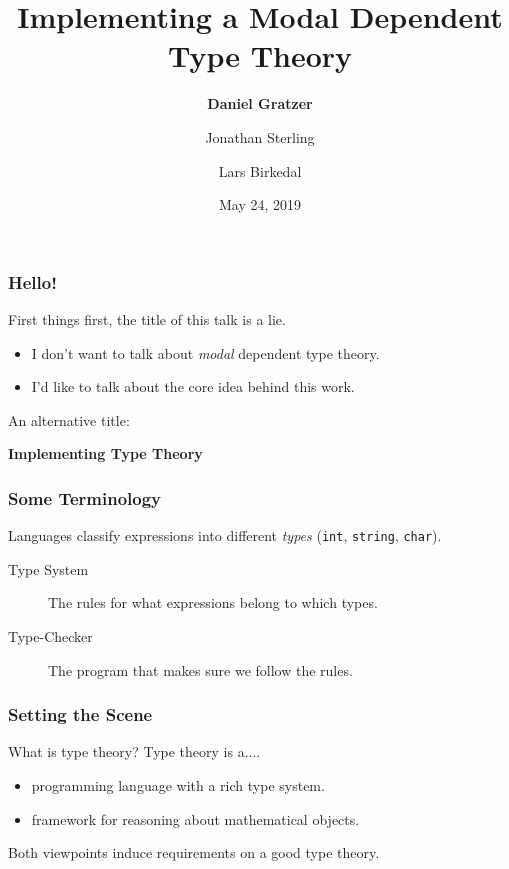 \documentclass[usenames,dvipsnames,aspectratio=169,12pt]{beamer}
\title{Implementing a Modal Dependent Type Theory}
\author{\textbf{Daniel Gratzer}\inst{1} \and Jonathan Sterling\inst{2} \and Lars Birkedal\inst{1}}
\institute{\inst{1} This University \smiley{} \\ \inst{2} Not This University \frownie{}}
\date{May 24, 2019}
\begin{document}
\begin{frame}[noframenumbering]
  \titlepage
\end{frame}

\begin{frame}
  \frametitle{Hello!}
  First things first, the title of this talk is a lie.
  \pause

  \begin{itemize}
  \item I don't want to talk about \emph{modal} dependent type theory.
  \item I'd like to talk about the core idea behind this work.
  \end{itemize}
  \pause
  \bigskip

  An alternative title:
  \begin{center}
    \Large\bf
    Implementing Type Theory
  \end{center}

\end{frame}

\begin{frame}
  \frametitle{Some Terminology}
  Languages classify expressions into different \emph{types}
  (\texttt{\textcolor{CobaltBlue}{int}},
  \texttt{\textcolor{CobaltBlue}{string}},
  \texttt{\textcolor{CobaltBlue}{char}}).
  \pause

  \begin{description}
  \item[Type System] The rules for what expressions belong to which types.
  \item[Type-Checker] The program that makes sure we follow the rules.
  \end{description}

\end{frame}

\begin{frame}
  \frametitle{Setting the Scene}

  What is type theory? Type theory is a....
  \begin{itemize}
  \item programming language with a rich type system.
  \item framework for reasoning about mathematical objects.

  \end{itemize}
  \pause
  \bigskip


  Both viewpoints induce requirements on a good type theory.
\end{frame}
\end{document}

